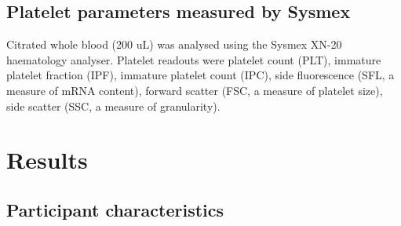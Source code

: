 \documentclass[11pt,twoside]{bristolthesis}
\begin{document}
\hypertarget{platelet-parameters-measured-by-sysmex}{%
\subsection{Platelet parameters measured by Sysmex}\label{platelet-parameters-measured-by-sysmex}}

Citrated whole blood (200 uL) was analysed using the Sysmex XN-20 haematology analyser. Platelet readouts were platelet count (PLT), immature platelet fraction (IPF), immature platelet count (IPC), side fluorescence (SFL, a measure of mRNA content), forward scatter (FSC, a measure of platelet size), side scatter (SSC, a measure of granularity).

\hypertarget{results-1}{%
\section{Results}\label{results-1}}

\hypertarget{participant-characteristics}{%
\subsection{Participant characteristics}\label{participant-characteristics}}
\end{document}
